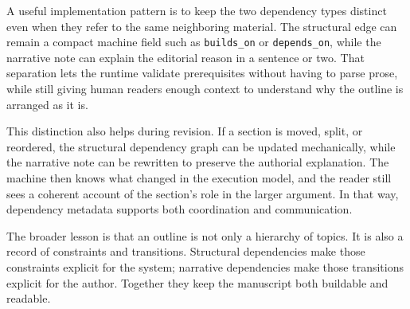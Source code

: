 A useful implementation pattern is to keep the two dependency types distinct even when they refer to the same neighboring material. The structural edge can remain a compact machine field such as \texttt{builds\_on} or \texttt{depends\_on}, while the narrative note can explain the editorial reason in a sentence or two. That separation lets the runtime validate prerequisites without having to parse prose, while still giving human readers enough context to understand why the outline is arranged as it is.

This distinction also helps during revision. If a section is moved, split, or reordered, the structural dependency graph can be updated mechanically, while the narrative note can be rewritten to preserve the authorial explanation. The machine then knows what changed in the execution model, and the reader still sees a coherent account of the section's role in the larger argument. In that way, dependency metadata supports both coordination and communication.

The broader lesson is that an outline is not only a hierarchy of topics. It is also a record of constraints and transitions. Structural dependencies make those constraints explicit for the system; narrative dependencies make those transitions explicit for the author. Together they keep the manuscript both buildable and readable.
